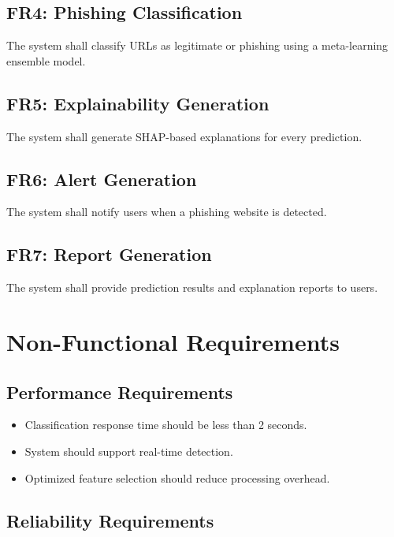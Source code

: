 \documentclass[12pt]{report}
\begin{document}
\subsection{FR4: Phishing Classification}

The system shall classify URLs as legitimate or phishing using a meta-learning ensemble model.

\subsection{FR5: Explainability Generation}

The system shall generate SHAP-based explanations for every prediction.

\subsection{FR6: Alert Generation}

The system shall notify users when a phishing website is detected.

\subsection{FR7: Report Generation}

The system shall provide prediction results and explanation reports to users.

\section{Non-Functional Requirements}

\subsection{Performance Requirements}

\begin{itemize}
    \item Classification response time should be less than 2 seconds.
    \item System should support real-time detection.
    \item Optimized feature selection should reduce processing overhead.
\end{itemize}

\subsection{Reliability Requirements}
\end{document}

